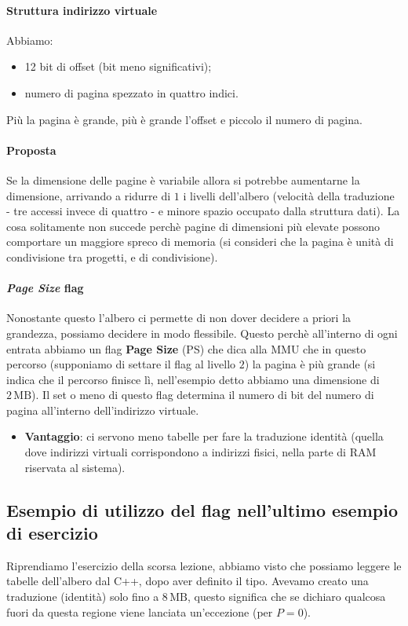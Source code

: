 \documentclass[11pt]{report}
\theoremstyle{definition}
\begin{document}
\paragraph{Struttura indirizzo virtuale} Abbiamo:
\begin{itemize}
	\item 12 bit di offset (bit meno significativi);
	\item numero di pagina spezzato in quattro indici.
\end{itemize}
Più la pagina è grande, più è grande l'offset e piccolo il numero di pagina. 
\paragraph{Proposta} Se la dimensione delle pagine è variabile allora si potrebbe aumentarne la dimensione, arrivando a ridurre di $1$ i livelli dell'albero (velocità della traduzione - tre accessi invece di quattro - e minore spazio occupato dalla struttura dati). La cosa solitamente non succede perchè pagine di dimensioni più elevate possono comportare un maggiore spreco di memoria (si consideri che la pagina è unità di condivisione tra progetti, e di condivisione).

\paragraph{\emph{Page Size} flag} Nonostante questo l'albero ci permette di non dover decidere a priori la grandezza, possiamo decidere in modo flessibile. Questo perchè all'interno di ogni entrata abbiamo un flag \textbf{Page Size} (PS) che dica alla MMU che in questo percorso (supponiamo di settare il flag al livello $2$) la pagina è più grande (si indica che il percorso finisce lì, nell'esempio detto abbiamo una dimensione di $2\,\text{MB}$). Il set o meno di questo flag determina il numero di bit del numero di pagina all'interno dell'indirizzo virtuale.
\begin{itemize}
	\item \textbf{Vantaggio}: ci servono meno tabelle per fare la traduzione identità (quella dove indirizzi virtuali corrispondono a indirizzi fisici, nella parte di RAM riservata al sistema).
\end{itemize}

\subsection{Esempio di utilizzo del flag nell'ultimo esempio di esercizio}
Riprendiamo l'esercizio della scorsa lezione, abbiamo visto che possiamo leggere le tabelle dell'albero dal C++, dopo aver definito il tipo. Avevamo creato una traduzione (identità) solo fino a $8\,\text{MB}$, questo significa che se dichiaro qualcosa fuori da questa regione viene lanciata un'eccezione (per $P=0$).
\end{document}
